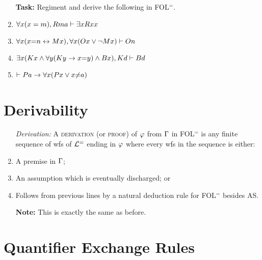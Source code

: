 \documentclass[a4paper, 11pt]{article} %
\begin{document}
\begin{enumerate}
  \item[\bf Task:] Regiment and derive the following in FOL$^=$.
  \item $\forall x(x = m), Rma\vdash \exists x Rxx$
  \item $\forall x(x{=}n \leftrightarrow Mx), \forall x(Ox \vee \neg Mx)\vdash On$
  \item $\exists x(Kx \wedge \forall y(Ky \rightarrow x{=}y) \wedge Bx), Kd\vdash Bd$
  \item $\vdash Pa \rightarrow \forall x(Px \vee x {\neq} a)$
\end{enumerate}


\section*{Derivability}%
  \label{Sec:Derivability}
  
\begin{enumerate}
  \item[\it Derivation:] A \textsc{derivation} (or \textsc{proof}) of $\varphi$ from $\Gamma$ in FOL$^=$ is any finite sequence of wfs of $\mathcal{L}^=$ ending in $\varphi$ where every wfs in the sequence is either:
    \item A premise in $\Gamma$;
    \item An assumption which is eventually discharged; or
    \item Follows from previous lines by a natural deduction rule for FOL$^=$ besides AS. 
  \item[\bf Note:] This is exactly the same as before.
\end{enumerate}




\section*{Quantifier Exchange Rules}

\end{document}
